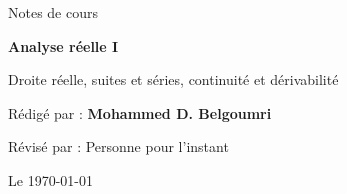 \begin{titlepage}
    \pagecolor{orange!10}
    \centering
    
    
    \Large
    \vspace{3cm}
    Notes de cours
    


    \vspace{2cm}
    \hrulefill
    \newline
    
    {
        \bfseries
        \Huge
        Analyse réelle I

        \Large
        Droite réelle, suites et séries, continuité et dérivabilité
    }
    \par
    \hrulefill


    \vspace{2cm}
    Rédigé par : \textbf{Mohammed D. Belgoumri}

    Révisé par : Personne pour l'instant

    \vfill
    Le \today

\end{titlepage}
